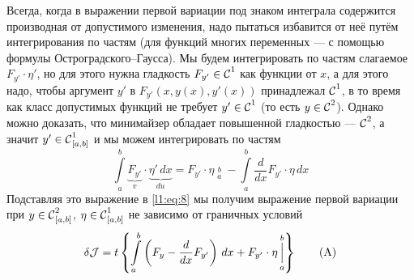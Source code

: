\documentclass[12pt,a4paper,openany,fleqn]{book}
\newcommand{\Cf}{\ensuremath{\mathcal{C}}}
\newcommand{\J}{\ensuremath{\mathcal{J}}}
\newcommand{\Cfn}[2][]{\ensuremath{\Cf{\mathstrut}^{#2}_{#1}}}
\newcommand{\der}[2]{\ensuremath{\frac{d#1}{d#2}}}
\theoremstyle{definition}
\begin{document}
Всегда, когда в выражении первой вариации под знаком интеграла содержится производная от допустимого изменения, надо пытаться избавится от неё путём интегрирования по частям (для функций многих переменных --- с помощью формулы Остроградского--Гаусса). Мы будем интегрировать по частям слагаемое $F_{y'}\cdot\eta'$, но для этого нужна гладкость $F_{y'}\in\Cfn[]{1}$ как функции от $x$, а для этого надо, чтобы аргумент $y'$ в $F_{y'}(x,y(x),y'(x))$ принадлежал \Cfn[]{1}, в то время как класс допустимых функций не требует $y'\in\Cfn[]{1}$ (то есть $y\in\Cfn[]{2}$). Однако можно доказать, что минимайзер обладает повышенной гладкостью --- \Cfn[]{2}, а значит $y'\in\Cfn[{[a,b]}]{1}$ и мы можем интегрировать по частям
\begin{equation}
	\label{l1:eq:9}
	\int\limits_a^b \underbrace{F_{y'}}_{v}\cdot\underbrace{\eta'\,dx}_{du}=F_{y'}\cdot\eta\mathop{\Big|}\limits_a^b-\int\limits_a^b \der{}{x}F_{y'}\cdot\eta\,dx
\end{equation}
Подставляя это выражение в \eqref{l1:eq:8} мы получим выражение первой вариации при $y\in\Cfn[{[a,b]}]{2}$, $\eta\in\Cfn[{[a,b]}]{1}$ не зависимо от граничных условий
\begin{equation*}
	\hfill \delta\J=t\left\{\int\limits_a^b\left(F_y-\der{}{x}F_{y'}\right)\,dx+F_{y'}\cdot\eta\mathop{\Big|}\limits_a^b\right\}\hfill\tag{A}
\end{equation*}
\end{document}
